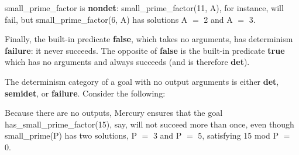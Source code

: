 \documentclass[a4paper,11pt,notitlepage,onecolumn]{book}
\begin{document}
\begin{small}

\begin{ptabular}
\nextline
{}
\nextline
{}
\nextline
{}
\nextline
\end{ptabular}

\end{small}
\textsf{small\_prime\_factor} is \textsf{\textbf{nondet}}: \textsf{small\_prime\_factor(11, A)}, for instance,
will fail, but \textsf{small\_prime\_factor(6, A)} has solutions \textsf{A {\ensuremath{=}} 2} and \textsf{A {\ensuremath{=}} 3}.

Finally, the built-in predicate \textsf{\textbf{false}}, which takes no arguments, has
determinism \textsf{\textbf{failure}}: it never succeeds.  The opposite of \textsf{\textbf{false}} is the
built-in predicate \textsf{\textbf{true}} which has no arguments and always succeeds (and is
therefore \textsf{\textbf{det}}).

\Note The determinism category of a goal with no output arguments is either
\textsf{\textbf{det}}, \textsf{\textbf{semidet}}, or \textsf{\textbf{failure}}.  Consider the following:
\begin{small}

\begin{ptabular}
\nextline
{}
\nextline
{}
\nextline
{}
\nextline
\end{ptabular}

\end{small}
Because there are no outputs, Mercury ensures that the goal
\\\textsf{has\_small\_prime\_factor(15)}, say, will not succeed more than once, even
though \textsf{small\_prime(P)} has two solutions, \textsf{P {\ensuremath{=}} 3} and \textsf{P {\ensuremath{=}} 5}, satisfying 
\textsf{15 mod P {\ensuremath{=}} 0}.
\end{document}
